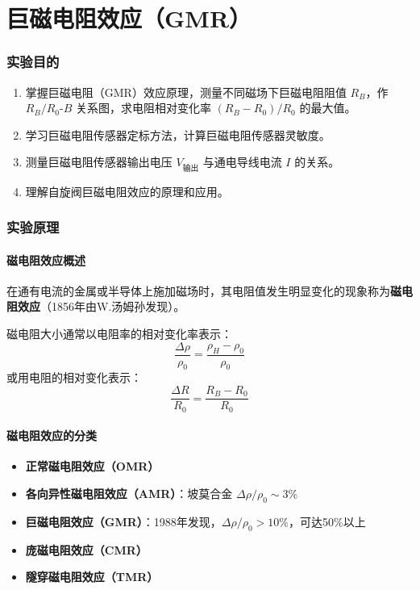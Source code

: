 \documentclass[12pt,a4paper]{article}
\newcommand{\hl}[1]{\textbf{\color{red}#1}}
\begin{document}
\newpage

\part{巨磁电阻效应（GMR）}

\section{实验目的}
\begin{enumerate}
    \item 掌握巨磁电阻（GMR）效应原理，测量不同磁场下巨磁电阻阻值 \(R_B\)，作 \(R_B/R_0\)-\(B\) 关系图，求电阻相对变化率 \((R_B-R_0)/R_0\) 的最大值。
    \item 学习巨磁电阻传感器定标方法，计算巨磁电阻传感器灵敏度。
    \item 测量巨磁电阻传感器输出电压 \(V_{\text{输出}}\) 与通电导线电流 \(I\) 的关系。
    \item 理解自旋阀巨磁电阻效应的原理和应用。
\end{enumerate}

\section{实验原理}

\subsection{磁电阻效应概述}
在通有电流的金属或半导体上施加磁场时，其电阻值发生明显变化的现象称为\textbf{磁电阻效应}（1856年由W.汤姆孙发现）。

磁电阻大小通常以电阻率的相对变化率表示：
\begin{equation}
    \frac{\Delta\rho}{\rho_0} = \frac{\rho_H - \rho_0}{\rho_0}
\end{equation}
或用电阻的相对变化表示：
\begin{equation}
    \frac{\Delta R}{R_0} = \frac{R_B - R_0}{R_0}
\end{equation}

\subsection{磁电阻效应的分类}
\begin{itemize}
    \item \textbf{正常磁电阻效应（OMR）}
    \item \textbf{各向异性磁电阻效应（AMR）}：坡莫合金 \(\Delta\rho/\rho_0 \sim 3\%\)
    \item \hl{\textbf{巨磁电阻效应（GMR）}}：1988年发现，\(\Delta\rho/\rho_0 > 10\%\)，可达50\%以上
    \item \textbf{庞磁电阻效应（CMR）}
    \item \textbf{隧穿磁电阻效应（TMR）}
\end{itemize}
\end{document}
